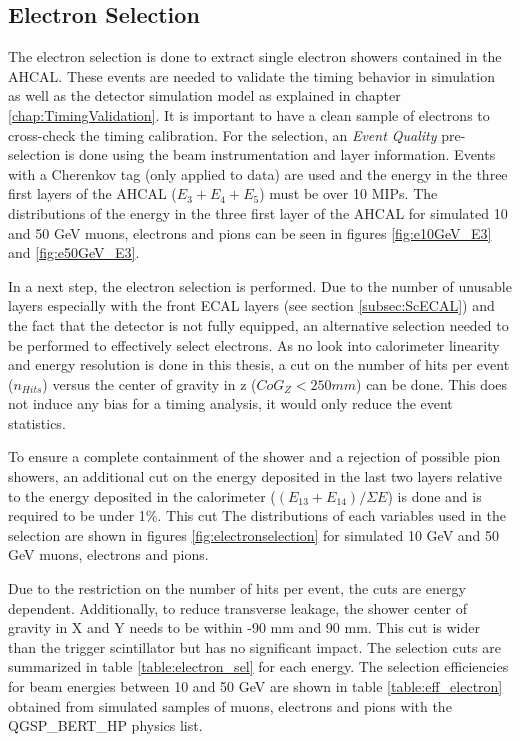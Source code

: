 \subsection{Electron Selection}
\label{subsec:elec_sel}

The electron selection is done to extract single electron showers contained in the AHCAL. These events are needed to validate the timing behavior in simulation as well as the detector simulation model as explained in chapter \ref{chap:TimingValidation}. It is important to have a clean sample of electrons to cross-check the timing calibration. For the selection, an \textit{Event Quality} pre-selection is done using the beam instrumentation and layer information. Events with a Cherenkov tag (only applied to data) are used and the energy in the three first layers of the AHCAL ($E_3+E_4+E_5$) must be over 10 MIPs. The distributions of the energy in the three first layer of the AHCAL for simulated 10 and 50 GeV muons, electrons and pions can be seen in figures \ref{fig:e10GeV_E3} and \ref{fig:e50GeV_E3}.

In a next step, the electron selection is performed. Due to the number of unusable layers especially with the front ECAL layers (see section \ref{subsec:ScECAL}) and the fact that the detector is not fully equipped, an alternative selection needed to be performed to effectively select electrons. As no look into calorimeter linearity and energy resolution is done in this thesis, a cut on the number of hits per event ($n_{Hits}$) versus the center of gravity in z ($CoG_Z < 250 mm$) can be done. This does not induce any bias for a timing analysis, it would only reduce the event statistics.

To ensure a complete containment of the shower and a rejection of possible pion showers, an additional cut on the energy deposited in the last two layers relative to the energy deposited in the calorimeter ($(E_{13}+E_{14})/\Sigma E$) is done and is required to be under 1\%. This cut The distributions of each variables used in the selection are shown in figures \ref{fig:electronselection} for simulated 10 GeV and 50 GeV muons, electrons and pions.

Due to the restriction on the number of hits per event, the cuts are energy dependent. Additionally, to reduce transverse leakage, the shower center of gravity in X and Y needs to be within -90 mm and 90 mm. This cut is wider than the trigger scintillator but has no significant impact. The selection cuts are summarized in table \ref{table:electron_sel} for each energy. The selection efficiencies for beam energies between 10 and 50 GeV are shown in table \ref{table:eff_electron} obtained from simulated samples of muons, electrons and pions with the QGSP\_BERT\_HP physics list.

